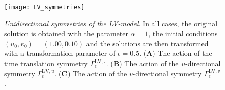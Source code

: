 \begin{figure}[htbp!]
  \begin{center}
\texttt{[image: LV\_symmetries]}
\caption{\textit{Unidirectional symmetries of the LV-model}. In all cases, the original solution is obtained with the parameter $\alpha=1$, the initial conditions $(u_0,v_0)=(1.00,0.10)$ and the solutions are then transformed with a transformation parameter of $\epsilon=0.5$. (\textbf{A}) The action of the time translation symmetry $\Gamma^{\mathrm{LV},\tau}_{\epsilon}$. (\textbf{B}) The action of the $u$-directional symmetry $\Gamma^{\mathrm{LV},u}_{\epsilon}$. (\textbf{C}) The action of the $v$-directional symmetry $\Gamma^{\mathrm{LV},v}_{\epsilon}$.}
\label{fig:LV_symmetries}
\end{center}
\end{figure}